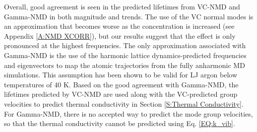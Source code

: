 \documentclass[aps,prb,onecolumn,preprint,footinbib,superscriptaddress,amsmath,amssymb,floatfix]{revtex4}
\begin{document}
Overall, good agreement is seen in the predicted lifetimes from VC-NMD and 
Gamma-NMD in both magnitude and trends. The use of the VC normal modes 
is an approximation that becomes worse as the concentration is increased 
(see Appendix \ref{A:NMD XCORR}), but our results suggest that the effect 
is only pronounced at the highest frequencies. 
The only approximation associated with Gamma-NMD is the use  
of the harmonic lattice dynamics-predicted frequencies and eigenvectors 
to map the atomic trajectories from the fully anharmonic MD simulations. 
This assumption has been shown to be valid for LJ argon below temperatures 
of 40 K.\cite{turney_predicting_2009-1} 
Based on the good agreement with Gamma-NMD, the 
lifetimes predicted by VC-NMD are used along with the VC-predicted 
group velocities to 
predict thermal conductivity in Section \ref{S:Thermal Conductivity}. 
For Gamma-NMD, there is no accepted way to predict the mode 
group velocities, so that the thermal conductivity cannot be predicted 
using Eq. \eqref{EQ:k_vib}. 


\clearpage

\end{document}
